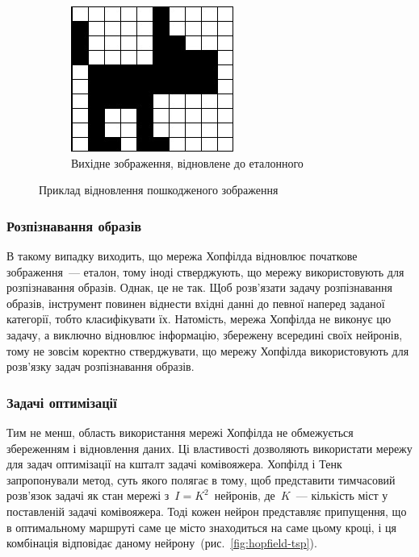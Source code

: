 \documentclass[
  a4paper,
  oneside,
  BCOR = 10mm,
  DIV = 12,
  12pt,
  headings = normal,
]{scrartcl}
\newlength{\gridunitwidth}
\begin{document}
\begin{figure}[!htbp]
\begin{subfigure}[t]{6\gridunitwidth - 0.5\gridunitwidth}
            \includegraphics[width = \columnwidth]{./assets/y04s02-ai-homework-01-s02-report-p03.jpg}
            \caption{Вихідне зображення, відновлене до еталонного}
            \label{subfig:image-recovery-03}
          \end{subfigure}
          \caption{Приклад відновлення пошкодженого зображення}
          \label{fig:image-recovery}
        \end{figure}

      \subsubsection{Розпізнавання образів}
        В такому випадку виходить, що мережа Хопфілда відновлює початкове зображення~— еталон, тому іноді стверджують, що мережу використовують для розпізнавання образів. Однак, це не так. Щоб розв'язати задачу розпізнавання образів, інструмент повинен віднести вхідні данні до певної наперед заданої категорії, тобто класифікувати їх. Натомість, мережа Хопфілда не виконує цю задачу, а виключно відновлює інформацію, збережену всередині своїх нейронів, тому не зовсім коректно стверджувати, що мережу Хопфілда використовують для розв'язку задач розпізнавання образів.

      \subsubsection{Задачі оптимізації}
        Тим не менш, область використання мережі Хопфілда не обмежується збереженням і відновлення даних. Ці властивості дозволяють використати мережу для задач оптимізації на кшталт задачі комівояжера. Хопфілд і Тенк запропонували метод, суть якого полягає в тому, щоб представити тимчасовий розв'язок задачі як стан мережі з~$I = K^2$~нейронів, де~$K$~— кількість міст у поставленій задачі комівояжера. Тоді кожен нейрон представляє припущення, що в оптимальному маршруті саме це місто знаходиться на саме цьому кроці, і ця комбінація відповідає даному нейрону~(рис.~\ref{fig:hopfield-tsp}).
\end{document}
